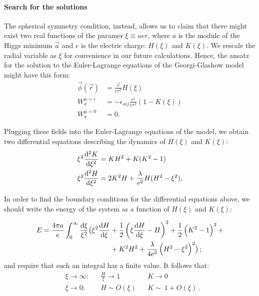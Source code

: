 \documentclass[main.tex]{subfiles}
\begin{document}
   \paragraph{Search for the solutions}
   The spherical symmetry condition, instead, allows us to claim that there might exist two real functions of the paramer $\xi \equiv aer$, where $a$ is the module of the Higgs minimum $\vec{a}$ and $e$ is the electric charge: $H(\xi)$ and $K(\xi)$. We rescale the radial variable as $\xi$ for convenience in our future calculations. Hence, the ansatz for the solution to the Euler-Lagrange equations of the Georgi-Glashow model might have this form: 
\begin{subequations}
  \begin{align}
      \vec{\phi}(\vec{r}) &= \frac{\vec{r}}{er^2}H(\xi) \\ 
      W^{\mu =i}_{a} &= - \epsilon_{aij}\frac{r^j}{er^2}(1 - K(\xi)) \\
      W^{\mu=0}_{a}&=0. 
  \end{align}
\end{subequations}
  
  Plugging these fields into the Euler-Lagrange equations of the model, we obtain two differential equations describing the dynamics of $H(\xi)$ and $K(\xi)$: 
  \begin{subequations} \label{eq:thooft-polyakov-equations} 
  \begin{align}
  \xi ^2 \dv[2]{K}{\xi} &= KH^2 + K(K^2-1)   \label{eq:H}\\
  \xi ^2 \dv[2]{H}{\xi} &= 2K^2H + \frac{\lambda}{e^2}H (H^2 -\xi^2), \label{eq:K}
  \end{align}
  \end{subequations}
  
  In order to find the boundary conditions for the differential equations above, we should write the energy of the system as a function of $H(\xi)$ and $K(\xi)$:

  \begin{equation}
  \begin{split}
  E = \frac{4 \pi a}{e} \int_{0}^{\infty} \frac{\dd{\xi}}{\xi^2}  \bigr( \xi^2\dv{H}{\xi}  &+  \frac{1}{2}\left( \xi \dv{H}{\xi} -H \right)^2  +  
  \frac{1}{2} \left( K^2 - 1 \right)^2 +  \\
  & +K^2 H^2 + \frac{\lambda}{4e^2} \left( H^2-\xi^2\right)^2   \bigr)\,;
  \end{split}
  \end{equation}
and require that such an integral has a finite value. It follows that: 
\begin{subequations}
  \begin{align}
 &\xi \to \infty \colon   &&\frac{H}{\xi} \to 1 &&K \to 0     \label{eq:bound1}\\
 &\xi  \to 0      \colon  &&H \sim  O(\xi)     &&K \sim \ 1 + O(\xi) \,. \label{eq:bound2}
  \end{align}
\end{subequations}
 
\end{document}
